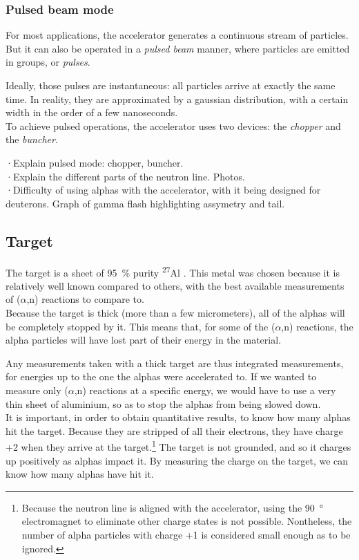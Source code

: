 \documentclass[a4paper,12pt]{report}
\newcommand{\an}{($\alpha$,n) }
\newcommand{\Aliso}{\textsuperscript{27}Al }
\begin{document}
\subsubsection{Pulsed beam mode}
For most applications, the accelerator generates a continuous stream of particles.
But it can also be operated in a \textit{pulsed beam} manner, where particles are emitted in groups, or \textit{pulses}.

Ideally, those pulses are instantaneous: all particles arrive at exactly the same time.
In reality, they are approximated by a gaussian distribution, with a certain width in the order of a few nanoseconds.	%
\\

To achieve pulsed operations, the accelerator uses two devices: the \textit{chopper} and the \textit{buncher}.

·Explain pulsed mode: chopper, buncher.\\
·Explain the different parts of the neutron line. Photos.\\
·Difficulty of using alphas with the accelerator, with it being designed for deuterons. Graph of gamma flash highlighting assymetry and tail.\\

\subsection{Target}
The target is a sheet of \qty{95}{\percent} purity \Aliso.	%
This metal was chosen because it is relatively well known compared to others, with the best available measurements of \an reactions to compare to.
\\

Because the target is thick (more than a few micrometers), all of the alphas will be completely stopped by it.
This means that, for some of the \an reactions, the alpha particles will have lost part of their energy in the material.

Any measurements taken with a thick target are thus integrated measurements, for energies up to the one the alphas were accelerated to.
If we wanted to measure only \an reactions at a specific energy, we would have to use a very thin sheet of aluminium, so as to stop the alphas from being slowed down.
\\

It is important, in order to obtain quantitative results, to know how many alphas hit the target.
Because they are stripped of all their electrons, they have charge +2 when they arrive at the target.\footnote{Because the neutron line is aligned with the accelerator, using the \qty{90}{\degree} electromagnet to eliminate other charge states is not possible. Nontheless, the number of alpha particles with charge +1 is considered small enough as to be ignored.}
The target is not grounded, and so it charges up positively as alphas impact it.
By measuring the charge on the target, we can know how many alphas have hit it.
\end{document}
